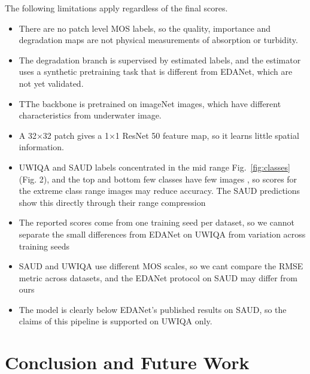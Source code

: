 \documentclass[conference]{IEEEtran}
\begin{document}
The following limitations apply regardless of the final scores.
\vspace{0.3cm}
\begin{itemize}
\item There are no patch level MOS labels, so the quality, importance and degradation maps are not physical measurements of absorption or turbidity.
\item The degradation branch is supervised by estimated labels, and the estimator uses a synthetic pretraining task that is different from EDANet, which are not yet validated.
\item TThe backbone is pretrained on imageNet images, which have different characteristics from underwater image.
\item A 32×32 patch gives a 1×1 ResNet 50 feature map, so it learns little spatial information.
\item UWIQA and SAUD labels concentrated in the mid range Fig.~\ref{fig:classes}(Fig. 2), and the top and bottom few classes have few images , so scores for the extreme class range images may reduce accuracy. The SAUD predictions show this directly through their range compression
\item The reported scores come from one training seed per dataset, so we cannot separate the small differences from EDANet on UWIQA from variation across training seeds
\item SAUD and UWIQA use different MOS scales, so we cant compare the RMSE metric across datasets, and the EDANet protocol on SAUD may differ from ours
\item The model is clearly below EDANet’s published results on SAUD, so the claims of this pipeline is supported on UWIQA only.
\end{itemize}
\vspace{0.2cm}
\section{Conclusion and Future Work}
\end{document}

